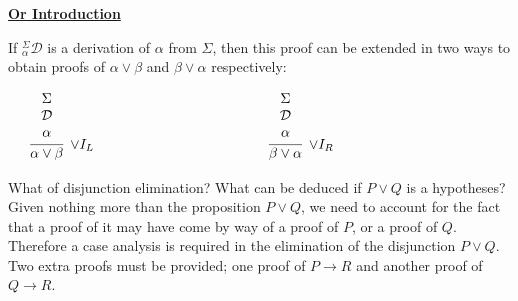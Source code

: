 \documentclass{book}
\begin{document}
    \begin{mdframed}

        \underline{{\bf Or Introduction}}

        If $^{\Sigma}_{\alpha}\mathcal{D}$ is a derivation of $\alpha$ from $\Sigma$, then this proof can be extended in two ways to obtain proofs of $\alpha \lor \beta$ and $\beta \lor \alpha$ respectively: 

        \begin{center}
            $\begin{array} { c c c }
            
                \begin{array}{ c c }		
                    \begin{array}{c}		
                        \infer[\lor I_{L}]{\alpha \lor \beta}
                        {\begin{array}{c} \Sigma \\ \mathcal{D} \\ \alpha \end{array}}
                    \end{array}
                \end{array}
    
            & \hspace{3cm} &
    
            \begin{array}{ c c }		
                \begin{array}{c}		
                    \infer[\lor I_{R}]{\beta \lor \alpha}
                    {\begin{array}{c} \Sigma \\ \mathcal{D} \\ \alpha \end{array}}
                \end{array}
            \end{array}	\\		
    
            \end{array}$
        \end{center}	
    \end{mdframed}

    What of disjunction elimination? What can be deduced if $P \lor Q$ is a hypotheses? Given nothing more than the proposition $P \lor Q$, we need to account for the fact that a proof of it may have come by way of a proof of $P$, or a proof of $Q$. Therefore a case analysis is required in the elimination of the disjunction $P \lor Q$. Two extra proofs must be provided; one proof of $P \to R$ and another proof of $Q \to R$. 
\end{document}
